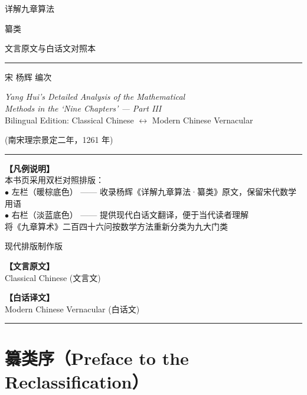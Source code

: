 \documentclass[11pt,a4paper]{article}
\newcommand{\shortline}{\noindent\rule{0.5\textwidth}{0.4pt}\par}
\newcommand{\colheader}{%
  \begin{center}
  \begin{minipage}[t]{0.45\textwidth}
  \centering\textcolor{colheadcl}{\textbf{【文言原文】}}\\[2pt]
  \footnotesize\textcolor{colheadcl}{Classical Chinese (文言文)}
  \end{minipage}%
  \hfill%
  \begin{minipage}[t]{0.45\textwidth}
  \centering\textcolor{colheadmd}{\textbf{【白话译文】}}\\[2pt]
  \footnotesize\textcolor{colheadmd}{Modern Chinese Vernacular (白话文)}
  \end{minipage}
  \end{center}
  \vspace{6pt}
  \noindent\rule{\textwidth}{0.4pt}
  \vspace{6pt}
}
\begin{document}
\begin{titlepage}
\centering
\vspace*{2cm}
{\fontsize{30}{38}\selectfont\color{titlecolor} 详解九章算法}
\vspace{0.8cm}

{\fontsize{22}{28}\selectfont\color{sectioncolor} 纂类}
\vspace{0.3cm}

{\Large\color{prefacecolor} 文言原文与白话文对照本}
\vspace{1.2cm}

\shortline
\vspace{0.8cm}

{\LARGE 宋 \quad 杨辉 \quad 编次}
\vspace{0.6cm}

{\large\textit{Yang Hui's Detailed Analysis of the Mathematical\\[0.3em]
Methods in the `Nine Chapters' --- Part III}}\\[0.4em]
{\normalsize Bilingual Edition: Classical Chinese $\leftrightarrow$ Modern Chinese Vernacular}
\vspace{0.4cm}

{\normalsize (南宋理宗景定二年，1261 年)}
\vspace{1.2cm}

\shortline
\vspace{0.8cm}

\begin{minipage}{0.88\textwidth}
\centering
\small
\textbf{【凡例说明】}\\[0.3em]
本书页采用双栏对照排版：\\[0.2em]
\textcolor{colheadcl}{$\bullet$ 左栏（暖棕底色）} —— 收录杨辉《详解九章算法·纂类》原文，保留宋代数学用语\\[0.2em]
\textcolor{colheadmd}{$\bullet$ 右栏（淡蓝底色）} —— 提供现代白话文翻译，便于当代读者理解\\[0.2em]
将《九章算术》二百四十六问按数学方法重新分类为九大门类
\end{minipage}

\vfill
{\small 现代排版制作版}
\end{titlepage}

\tableofcontents
\newpage

\colheader

\section*{纂类序（Preface to the Reclassification）}
\end{document}
